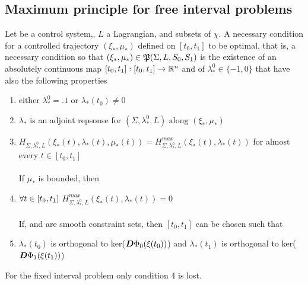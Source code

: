 \subsection{Maximum principle for free interval problems}
Let \controlSystem be a control system,, $L$ a Lagrangian, \sz and \so subsets of $\chi$.
A necessary condition for a controlled trajectory $(\xi_*,\mu_*)$ defined on $[t_0,t_1]$  to be optimal, that is, a necessary condition so that $(\xi_*,\mu_*)\in\mathfrak{P}(\Sigma,L,S_0,S_1)$ is the existence of an absolutely continuous map $[t_0,t_1]:[t_0,t_1]\rightarrow\mathbb{R}^n$ and of  $\lambda_*^0\in\{-1,0\}$ that have also the following properties
\begin{enumerate}
	\item either $\lambda_*^0=.1$ or $\lambda_*(t_0)\ne0$
	\item $\lambda_*$ is an adjoint repsonse for $(\Sigma,\lambda_*^0,L)\text{ along }(\xi_*,\mu_*)$
	\item $H_{\Sigma,\lambda_*^0,L}(\xi_*(t),\lambda_*(t),\mu_*(t))=H_{\Sigma,\lambda_*^0,L}^{max}(\xi_*(t),\lambda_*(t))$ for almost every $t\in[t_0,t_1]$\\\\
	If $\mu_*$ is bounded, then 
	\item $\forall t\in[t_0,t_1]$  $H_{\Sigma,\lambda_*^0,L}^{max}(\xi_*(t),\lambda_*(t))=0$\\\\
	
	If, \so and \sz are smooth constraint sets, then $[t_0,t_1]$ can be chosen such that 
	\item $\lambda_*(t_0)$ is orthogonal to ker($\boldsymbol{D}\Phi_0(\xi(t_0))$) and $\lambda_*(t_1)$ is orthogonal to ker($\boldsymbol{D}\Phi_1(\xi(t_1))$)
\end{enumerate}
For the fixed interval problem only condition 4 is lost.

